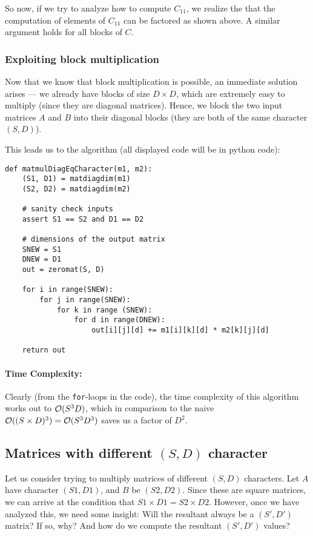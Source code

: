 \documentclass[11pt]{article}
\begin{document}
So now, if we try to analyze how to compute $C_{11}$, we realize the that
the computation of elements of $C_{11}$ can be factored as shown above. A
similar argument holds for all blocks of $C$.

\subsubsection{Exploiting block multiplication}

Now that we know that block multiplication is possible, an immediate solution
arises --- we already have blocks of size $D \times D$, which are extremely
easy to multiply (since they are diagonal matrices). Hence, we block the two
input matrices $A$ and $B$ into their diagonal blocks (they are both of the
same character $(S, D)$).

This leads us to the algorithm (all displayed code will be in python code):
\begin{verbatim}
def matmulDiagEqCharacter(m1, m2):
    (S1, D1) = matdiagdim(m1)
    (S2, D2) = matdiagdim(m2)

    # sanity check inputs
    assert S1 == S2 and D1 == D2

    # dimensions of the output matrix
    SNEW = S1
    DNEW = D1
    out = zeromat(S, D)

    for i in range(SNEW):
        for j in range(SNEW):
            for k in range (SNEW):
                for d in range(DNEW):
                    out[i][j][d] += m1[i][k][d] * m2[k][j][d]

    return out
\end{verbatim}

\paragraph{\textbf{Time Complexity:}}
Clearly (from the \texttt{for}-loops in the code), the time complexity of this
algorithm works out to $\mathcal{O}(S^3D)$, which in comparison to the naive
$\mathcal{O}((S \times D)^3) = \mathcal{O}(S^3 D^3)$ saves us a factor of $D^2$.

\subsection{Matrices with different $(S, D)$ character}
Let us consider trying to multiply matrices of different $(S, D)$ characters.
Let $A$ have character $(S1, D1)$, and $B$ be $(S2, D2)$. Since these
are square matrices, we can arrive at the condition that $S1 \times D1 = S2
\times D2$.
However, once we have analyzed this, we need some insight: Will the resultant
always be a $(S', D')$ matrix? If so, why? And how do we compute the resultant
$(S', D')$ values?
\end{document}
